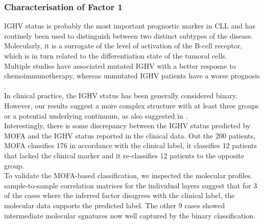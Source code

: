 \subsubsection{Characterisation of Factor 1}

IGHV status is probably the most important prognostic marker in CLL and has routinely been used to distinguish between two distinct subtypes of the disease\cite{Fabbri2016,Bulian2017,Crombie2017,Damle1999}. Molecularly, it is a surrogate of the level of activation of the B-cell receptor, which is in turn related to the differentiation state of the tumoral cells.\\
Multiple studies have associated mutated IGHV with a better resposne to chemoimmunotherapy, whereas unmutated IGHV patients have a worse prognosis \cite{Fabbri2016,Bulian2017,Crombie2017,Damle1999}.\\

In clinical practice, the IGHV status has been generally considered binary. However, our results suggest a more complex structure with at least three groups or a potential underlying continuum, as also suggested in \cite{Oakes2015,Queiros2014}.\\
Interestingly, there is some discrepancy between the IGHV status predicted by MOFA and the IGHV status reported in the clinical data. Out the 200 patients, MOFA classifies 176 in accordance with the clinical label, it classifies 12 patients that lacked the clinical marker and it re-classifies 12 patients to the opposite group.\\
To validate the MOFA-based classification, we inspected the molecular profiles. sample-to-sample correlation matrices for the individual layers suggest that for 3 of the cases where the inferred factor disagrees with the clinical label, the molecular data supports the predicted label. The other 9 cases showed intermediate molecular sgnatures now well captured by the binary classification.\\

